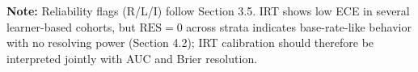\begin{table}[htbp]
{\begin{tabular}{lllrcccccc}
\end{tabular}%
}

\vspace{1ex}
{\scriptsize \textbf{Note:} Reliability flags (R/L/I) follow Section 3.5. IRT shows low ECE in several learner-based cohorts, but $\text{RES} = 0$ across strata indicates base-rate-like behavior with no resolving power (Section 4.2); IRT calibration should therefore be interpreted jointly with AUC and Brier resolution.\par}

\end{table}

